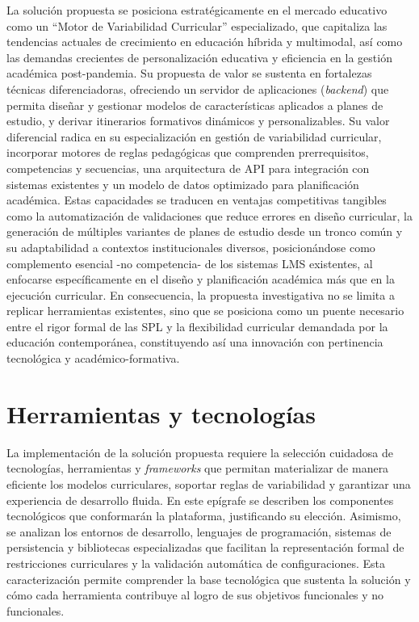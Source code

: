 La solución propuesta se posiciona estratégicamente en el mercado educativo
como un ``Motor de Variabilidad Curricular'' especializado, que capitaliza las
tendencias actuales de crecimiento en educación híbrida y multimodal, así
como las demandas crecientes de personalización educativa y eficiencia en la
gestión académica post-pandemia. Su propuesta de valor se sustenta en
fortalezas técnicas diferenciadoras, ofreciendo un servidor de aplicaciones (\textit{backend}) que permita 
diseñar y gestionar modelos de características aplicados a planes de estudio, 
y derivar itinerarios formativos dinámicos y personalizables. Su valor diferencial
radica en su especialización en gestión de variabilidad curricular, 
incorporar motores de reglas pedagógicas que comprenden
prerrequisitos, competencias y secuencias, una arquitectura de 
\ac{API} para integración con sistemas
existentes y un modelo de datos optimizado para planificación académica.
Estas capacidades se traducen en ventajas competitivas tangibles como la
automatización de validaciones que reduce errores en diseño curricular, la
generación de múltiples variantes de planes de estudio desde un tronco común y su
adaptabilidad a contextos institucionales diversos, posicionándose como
complemento esencial -no competencia- de los sistemas \ac{LMS} existentes, al
enfocarse específicamente en el diseño y planificación académica más que en
la ejecución curricular. En consecuencia, la propuesta investigativa no se limita 
a replicar herramientas existentes, sino que se posiciona como un puente necesario 
entre el rigor formal de las \ac{SPL} y la flexibilidad curricular demandada por la educación 
contemporánea, constituyendo así una innovación con pertinencia tecnológica y 
académico-formativa.
    
\section{Herramientas y tecnologías}

La implementación de la solución propuesta requiere la selección cuidadosa de tecnologías, 
herramientas y \textit{frameworks} que permitan materializar de manera eficiente los modelos 
curriculares, soportar reglas de variabilidad y garantizar una experiencia de desarrollo fluida. 
En este epígrafe se describen los componentes tecnológicos que conformarán la plataforma,
justificando su elección. Asimismo, se analizan los entornos de desarrollo, 
lenguajes de programación, sistemas de persistencia y bibliotecas especializadas que 
facilitan la representación formal de restricciones curriculares y la validación 
automática de configuraciones. Esta caracterización permite comprender la base 
tecnológica que sustenta la solución y cómo cada herramienta contribuye al logro de 
sus objetivos funcionales y no funcionales.

